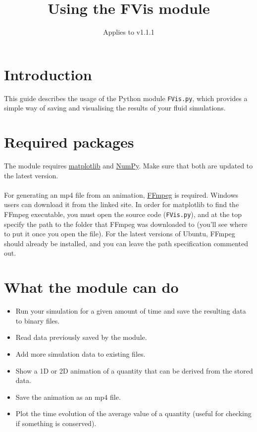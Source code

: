 \documentclass{article}
\newcommand{\ttt}[1]{\texttt{#1}}
\begin{document}
\title{\bfseries Using the FVis module}
\date{Applies to v1.1.1}

\maketitle
\tableofcontents
\newpage
{}

\section{Introduction}
\label{sec:intr}
This guide describes the usage of the Python module \ttt{FVis.py}, which provides a simple way of saving and visualising the results of your fluid simulations.

\section{Required packages}
\label{sec:pack}
The module requires \href{http://matplotlib.org/}{matplotlib} and \href{http://www.numpy.org/}{NumPy}. Make sure that both are updated to the latest version.\\\\
For generating an mp4 file from an animation, \href{https://ffmpeg.org/}{FFmpeg} is required. Windows users can download it from the linked site. In order for matplotlib to find the FFmpeg executable, you must open the source code (\ttt{FVis.py}), and at the top specify the path to the folder that FFmpeg was downloaded to (you'll see where to put it once you open the file). For the latest versions of Ubuntu, FFmpeg should already be installed, and you can leave the path specification commented out.

\section{What the module can do}
\label{sec:cando}
\begin{itemize}
	\item Run your simulation for a given amount of time and save the resulting data to binary files.
	\item Read data previously saved by the module.
	\item Add more simulation data to existing files.
	\item Show a 1D or 2D animation of a quantity that can be derived from the stored data.
	\item Save the animation as an mp4 file.
	\item Plot the time evolution of the average value of a quantity (useful for checking if something is conserved).
\end{itemize}
\end{document}
